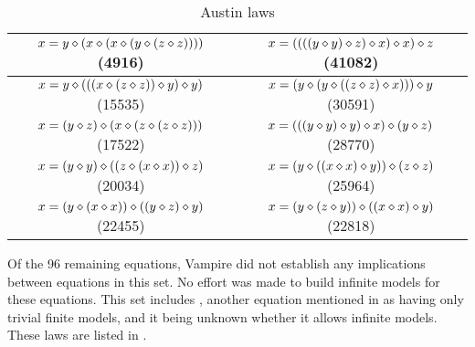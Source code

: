 \begin{table}[h]
\begin{tabular}{|c|c|}
\hline
$x = y \diamond (x \diamond (x \diamond (y \diamond (z \diamond z))))$ (4916) & $x = ((((y \diamond y) \diamond z) \diamond x) \diamond x) \diamond z$ (41082) \\ \hline
$x = y \diamond (((x \diamond (z \diamond z)) \diamond y) \diamond y)$ (15535) & $x = (y \diamond (y \diamond ((z \diamond z) \diamond x))) \diamond y$ (30591) \\ \hline
$x = (y \diamond z) \diamond (x \diamond (z \diamond (z \diamond z)))$ (17522) & $x = (((y \diamond y) \diamond y) \diamond x) \diamond (y \diamond z)$ (28770) \\ \hline
$x = (y \diamond y) \diamond ((z \diamond (x \diamond x)) \diamond z)$ (20034) & $x = (y \diamond ((x \diamond x) \diamond y)) \diamond (z \diamond z)$ (25964) \\ \hline
$x = (y \diamond (x \diamond x)) \diamond ((y \diamond z) \diamond y)$ (22455) & $x = (y \diamond (z \diamond y)) \diamond ((x \diamond x) \diamond y)$ (22818) \\ \hline
\end{tabular}
\caption{Austin laws}
\label{table1}
\end{table}

Of the 96 remaining equations, Vampire did not establish any implications between equations in this set. No effort was made to build infinite models for these equations.
This set includes , another equation mentioned in \cite{Kisielewicz2} as having only trivial finite models, and it being unknown whether it allows infinite models.
These laws are listed in .

